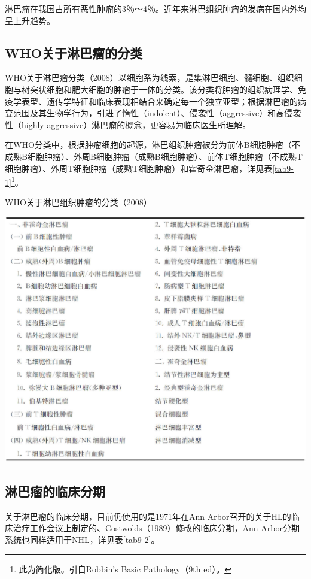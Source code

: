 淋巴瘤在我国占所有恶性肿瘤的3％～4％。近年来淋巴组织肿瘤的发病在国内外均呈上升趋势。

\subsection{WHO关于淋巴瘤的分类}

WHO关于淋巴瘤分类（2008）以细胞系为线索，是集淋巴细胞、髓细胞、组织细胞与树突状细胞和肥大细胞的肿瘤于一体的分类。该分类将肿瘤的组织病理学、免疫学表型、遗传学特征和临床表现相结合来确定每一个独立亚型；根据淋巴瘤的病变范围及其生物学行为，引进了惰性（indolent）、侵袭性（aggressive）和高侵袭性（highly
aggressive）淋巴瘤的概念，更容易为临床医生所理解。

在WHO分类中，根据肿瘤细胞的起源，淋巴组织肿瘤被分为前体B细胞肿瘤（不成熟B细胞肿瘤）、外周B细胞肿瘤（成熟B细胞肿瘤）、前体T细胞肿瘤（不成熟T细胞肿瘤）、外周T细胞肿瘤（成熟T细胞肿瘤）和霍奇金淋巴瘤，详见表\ref{tab9-1}\footnote{此为简化版。引自Robbin's Basic Pathology（9th ed）。}。

\begin{table}[ht]
    \caption{WHO关于淋巴组织肿瘤的分类（2008）}
    \label{tab9-1}
    \centering
    \includegraphics{./images/Image00140.jpg}
\end{table}

\subsection{淋巴瘤的临床分期}

关于淋巴瘤的临床分期，目前仍使用的是1971年在Ann
Arbor召开的关于HL的临床治疗工作会议上制定的、Costwolds（1989）修改的临床分期，Ann
Arbor分期系统也同样适用于NHL，详见表\ref{tab9-2}。

